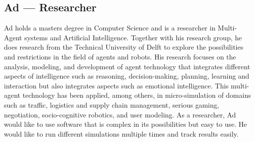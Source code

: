 \subsection{Ad –-- Researcher}
Ad holds a masters degree in Computer Science and is a researcher in Multi-Agent systems and Artificial Intelligence. Together with his research group, he does research from the Technical University of Delft to explore the possibilities and restrictions in the field of agents and robots. His research focuses on the analysis, modeling, and development of agent technology that integrates different aspects of intelligence such as reasoning, decision-making, planning, learning and interaction but also integrates aspects such as emotional intelligence. This multi-agent technology has been applied, among others, in micro-simulation of domains such as traffic, logistics and supply chain management, serious gaming, negotiation, socio-cognitive robotics, and user modeling. 
As a researcher, Ad would like to use software that is complex in its possibilities but easy to use. He would like to run different simulations multiple times and track results easily.
